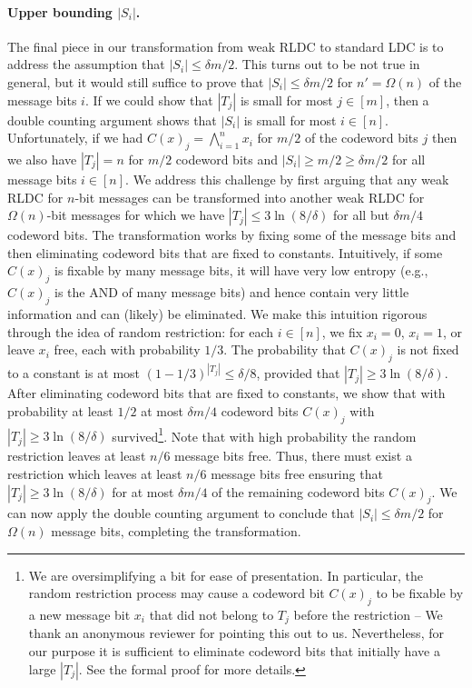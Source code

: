 \paragraph{Upper bounding \texorpdfstring{$|S_i|$}{|S\_i|}.} The final piece in our transformation from weak RLDC to standard LDC is to address the assumption that $|S_i|\le \delta m/2$. This turns out to be not true in general, but it would still suffice to prove that $|S_i| \leq \delta m/2$ for $n' = \Omega(n)$ of the message bits $i$. If we could show that $|T_j|$ is small for most $j \in [m]$, then a double counting argument shows that $|S_i|$ is small for most $i \in [n]$. Unfortunately, if we had  $C(x)_j = \bigwedge_{i=1}^n x_i$ for $m/2$ of the codeword bits $j$ then we also have $|T_j| = n$ for $m/2$ codeword bits and $|S_i| \geq m/2 \geq \delta m/2$ for all message bits $i \in [n]$. We address this challenge by first arguing that any weak RLDC for $n$-bit messages can be transformed into another weak RLDC for $\Omega(n)$-bit messages for which we have $|T_j|  \le 3\ln(8/\delta) $ for all but $\delta m/4$ codeword bits. The transformation works by fixing some of the message bits and then eliminating codeword bits that are fixed to constants. Intuitively, if some $C(x)_j$ is fixable by many message bits, it will have very low entropy (e.g., $C(x)_j$ is the AND of many message bits) and hence contain very little information and can (likely) be eliminated. We make this intuition rigorous through the idea of random restriction: for each $i \in [n]$, we fix $x_i=0$, $x_i=1$, or leave $x_i$ free, each with probability $1/3$. The probability that $C(x)_j$ is not fixed to a constant is at most $(1-1/3)^{|T_j|}\le \delta/8$, provided that $|T_j| \ge 3\ln(8/\delta)$. After eliminating codeword bits that are fixed to constants, we show that with probability at least $1/2$ at most $\delta m/4$ codeword bits $C(x)_j$ with $|T_j| \ge 3\ln(8/\delta)$ survived\footnote{We are oversimplifying a bit for ease of presentation. In particular, the random restriction process may cause a codeword bit $C(x)_j$ to be fixable by a new message bit $x_i$ that did not belong to $T_j$ before the restriction -- We thank an anonymous reviewer for pointing this out to us.
Nevertheless, for our purpose it is sufficient to eliminate codeword bits that initially have a large $|T_j|$. See the formal proof for more details.}. Note that with high probability the random restriction leaves at least $n/6$ message bits free. Thus, there must exist a restriction which leaves at least $n/6$ message bits free ensuring that $|T_j| \ge 3\ln(8/\delta)$ for at most $\delta m/4$ of the remaining codeword bits $C(x)_j$. We can now apply the double counting argument to conclude that $|S_i| \le \delta m/2$ for $\Omega(n)$ message bits, completing the transformation.

